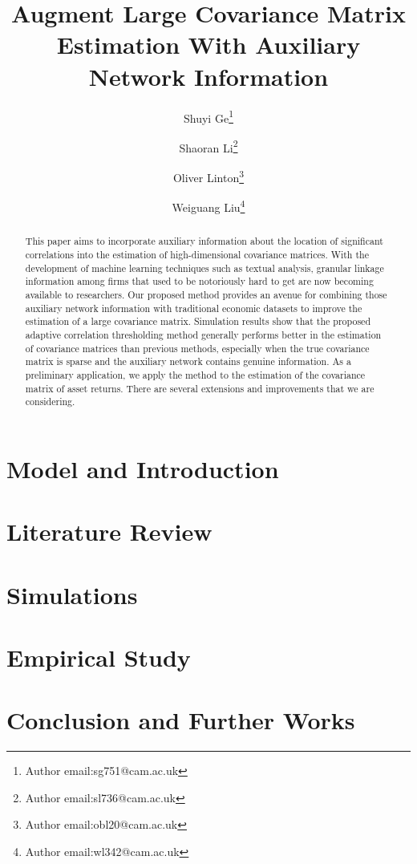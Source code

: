 \documentclass[12pt]{article}
\begin{document}
    \title{Augment Large Covariance Matrix Estimation With Auxiliary Network Information}
    \author[]{Shuyi Ge\thanks{Author email:sg751@cam.ac.uk}}
    \author[]{Shaoran Li\thanks{Author email:sl736@cam.ac.uk}}
    \author[]{Oliver Linton\thanks{Author email:obl20@cam.ac.uk}}
    \author[]{Weiguang Liu\thanks{Author email:wl342@cam.ac.uk}}
    \maketitle
    
    \begin{abstract}
        This paper aims to incorporate auxiliary information about the location of significant correlations into the estimation of high-dimensional covariance matrices. With the development of machine learning techniques such as textual analysis, granular linkage information among firms that used to be notoriously hard to get are now becoming available to researchers. Our proposed method provides an avenue for combining those auxiliary network information with traditional economic datasets to improve the estimation of a large covariance matrix. Simulation results show that the proposed adaptive correlation thresholding method generally performs better in the estimation of covariance matrices than previous methods, especially when the true covariance matrix is sparse and the auxiliary network contains genuine information. As a preliminary application, we apply the method to the estimation of the covariance matrix of asset returns. There are several extensions and improvements that we are considering.     
    \end{abstract}
    
    \section{Model and Introduction}
    \section{Literature Review}
    \section{Simulations} 
    \section{Empirical Study}
    \section{Conclusion and Further Works}

\printbibliography
\end{document}
